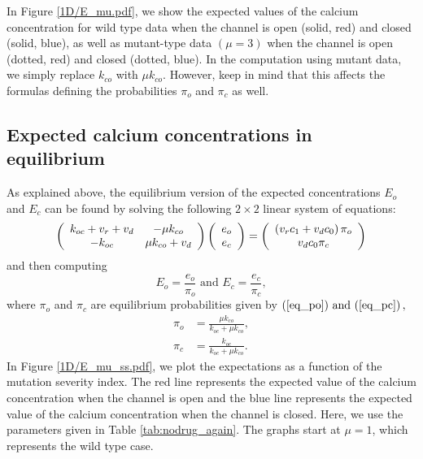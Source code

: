 In Figure \ref{1D/E_mu.pdf}, we show the expected values of the calcium concentration for
wild type data when the channel is open (solid, red) and closed (solid, blue),
as well as mutant-type data $(\mu=3)$ when the channel is open (dotted, red) and
closed (dotted, blue). In the computation using mutant data, we simply replace
$k_{co}$ with $\mu k_{co}$. However, keep in mind that this affects the formulas defining the 
probabilities $\pi_{o}$ and $\pi_{c}$ as well.


\bigskip


\subsection{Expected calcium concentrations in equilibrium}

As explained above, the equilibrium version of the expected concentrations
$E_{o}$ and $E_{c}$ can be found by solving the following $2\times2$ linear
system of equations:
\begin{equation}
\left(
\begin{array}
[c]{cc}%
k_{oc}+v_{r}+v_{d} & -\mu k_{co}\\
-k_{oc} & \mu k_{co}+v_{d}%
\end{array}
\right)  \left(
\begin{array}
[c]{c}%
e_{o}\\
e_{c}%
\end{array}
\right)  =\left(
\begin{array}
[c]{c}%
\left(  v_{r}c_{1}+v_{d}c_{0}\right)  \pi_{o}\\
v_{d}c_{0}\pi_{c}%
\end{array}
\right)  \label{expectation1001}%
\end{equation}
and then computing
\[
E_{o}=\frac{e_{o}}{\pi_{o}}\text{ and }E_{c}=\frac{e_{c}}{\pi_{c}},
\]
where $\pi_{o}$ and $\pi_{c}$ are equilibrium probabilities given by $\left(
\ref{eq_po})\text{ and (}\ref{eq_pc}\right)  ,$
\begin{align}
\pi_{o} &  =\frac{\mu k_{co}}{k_{oc}+\mu k_{co}}, \label{200}\\
\pi_{c} &  =\frac{k_{oc}}{k_{oc}+\mu k_{co}}. \label{201}
\end{align}
In Figure \ref{1D/E_mu_ss.pdf}, we plot the expectations as a function of the
mutation severity index. The red line represents the expected value of the
calcium concentration when the channel is open and the blue line represents
the expected value of the calcium concentration when the channel is closed.
Here, we use the parameters given in Table \ref{tab:nodrug_again}. The graphs
start at $\mu=1$, which represents the wild type case.

